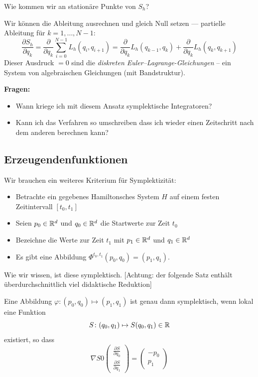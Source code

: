 Wie kommen wir an stationäre Punkte von $S_h$?

Wir können die Ableitung ausrechnen und gleich Null setzen --- partielle Ableitung für $k=1, \dots, N-1$:
\begin{equation*}
	\frac{\partial S_h}{\partial q_k}
	=
	\frac{\partial}{\partial q_k} \sum_{i=0}^{N-1} L_h (q_i, q_{i+1})
	=
	\frac{\partial}{\partial q_k} L_h(q_{k-1}, q_k) +  \frac{\partial}{\partial q_k} L_h(q_k, q_{k+1})
\end{equation*}
Dieser Ausdruck $=0$ sind die \emph{diskreten Euler--Lagrange-Gleichungen} -- ein System von algebraischen Gleichungen (mit Bandstruktur).

\textbf{Fragen:}
\begin{itemize}
	\item Wann kriege ich mit diesem Ansatz symplektische Integratoren?
	\item Kann ich das Verfahren so umschreiben dass ich wieder einen Zeitschritt nach dem anderen berechnen kann?
\end{itemize}

\subsection{Erzeugendenfunktionen}

Wir brauchen ein weiteres Kriterium für Symplektizität:
\begin{itemize}
	\item Betrachte ein gegebenes Hamiltonsches System $H$ auf einem festen Zeitintervall $[t_0,t_1]$
	\item Seien $p_0 \in \mathbb R^d$ und $q_0 \in \mathbb R^d$ die Startwerte zur Zeit $t_0$
	\item Bezeichne die Werte zur Zeit $t_1$ mit  $p_1 \in \mathbb R^d$ und $q_1 \in \mathbb R^d$
	\item Es gibt eine Abbildung $\Phi^{t_0,t_1}(p_0,q_0) = (p_1,q_1)$.
\end{itemize}

Wie wir wissen, ist diese symplektisch.
{[Achtung: der folgende Satz enthält überdurchschnittlich viel didaktische Reduktion]}

\begin{satz}
	\label{thm:erzeugendenfunktion}
	Eine Abbildung $\varphi\colon (p_0,q_0) \mapsto (p_1,q_1)$ ist genau dann symplektisch, wenn lokal eine Funktion
	\begin{equation*}
	S\colon (q_0,q_1)\mapsto S(q_0,q_1)\in\mathbb R
	\end{equation*}
	existiert, so dass
	\begin{equation}\label{eq:abbildung_symplektisch}
	\nabla S 0
	\begin{pmatrix}
	\frac{\partial S}{\partial q_0}  \\
	\frac{\partial S}{\partial q_1}
	\end{pmatrix} = \begin{pmatrix}
	-p_0 \\ p_1
	\end{pmatrix}
	\end{equation}
\end{satz}

